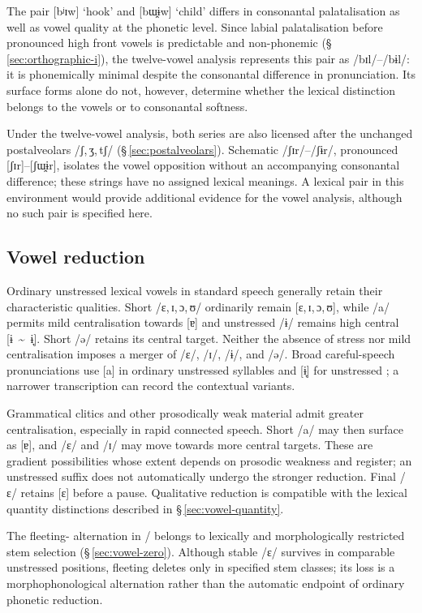 The pair  [bʲɪw] `hook' and  [bɯ̯ɨw] `child' differs
in consonantal palatalisation as well as vowel quality at the phonetic level.
Since labial palatalisation before pronounced high front vowels is predictable and
non-phonemic (§\,\ref{sec:orthographic-i}), the twelve-vowel analysis
represents this pair as /bɪl/--/bɨl/: it is phonemically minimal despite
the consonantal difference in pronunciation.
Its surface forms alone do not, however, determine whether the lexical
distinction belongs to the vowels or to consonantal softness.

Under the twelve-vowel analysis, both series are also licensed after the
unchanged postalveolars /ʃ,\,ʒ,\,tʃ/ (§\,\ref{sec:postalveolars}).
Schematic /ʃɪr/--/ʃɨr/, pronounced
[ʃɪr]--[ʃɯ̯ɨr], isolates the vowel opposition
without an accompanying consonantal difference; these strings have no
assigned lexical meanings. A lexical pair in this environment would provide
additional evidence for the vowel analysis, although no such pair is
specified here.

\subsection{Vowel reduction}

Ordinary unstressed lexical vowels in standard speech generally retain
their characteristic qualities. Short /ɛ,\,ɪ,\,ɔ,\,ʊ/ ordinarily remain
[ɛ,\,ɪ,\,ɔ,\,ʊ], while /a/ permits mild centralisation towards [ɐ]
and unstressed /ɨ/ remains high central [ɨ~\textasciitilde{}~ɨ̞]. Short
/ə/ retains its central target. Neither the absence of stress nor mild
centralisation imposes a merger of /ɛ/, /ɪ/, /ɨ/, and /ə/.
Broad careful-speech pronunciations use [a] in ordinary unstressed syllables
and [ɨ̞] for unstressed ; a narrower transcription can record the
contextual variants.

Grammatical clitics and other prosodically weak material admit greater
centralisation, especially in rapid connected speech. Short /a/ may then
surface as [ɐ], and /ɛ/ and /ɪ/ may move towards more central
targets. These are gradient possibilities whose extent depends on prosodic
weakness and register; an unstressed suffix does not automatically undergo
the stronger reduction. Final /ɛ/ retains [ɛ] before a pause. Qualitative
reduction is compatible with the lexical quantity distinctions described
in §\,\ref{sec:vowel-quantity}.

The fleeting- alternation in / belongs to
lexically and morphologically restricted stem selection
(§\,\ref{sec:vowel-zero}). Although stable /ɛ/ survives in comparable
unstressed positions, fleeting  deletes only in specified stem
classes; its loss is a morphophonological alternation rather than the
automatic endpoint of ordinary phonetic reduction.

